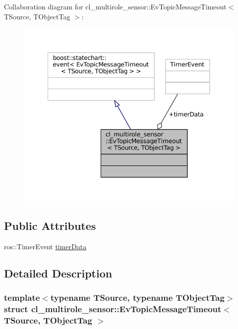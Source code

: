 Collaboration diagram for cl\+\_\+multirole\+\_\+sensor\+:\+:Ev\+Topic\+Message\+Timeout$<$ T\+Source, T\+Object\+Tag $>$\+:
\nopagebreak
\begin{figure}[H]
\begin{center}
\leavevmode
\includegraphics[width=348pt]{structcl__multirole__sensor_1_1EvTopicMessageTimeout__coll__graph}
\end{center}
\end{figure}
\subsection*{Public Attributes}
\begin{DoxyCompactItemize}
\item 
ros\+::\+Timer\+Event \hyperlink{structcl__multirole__sensor_1_1EvTopicMessageTimeout_af4d418aeb793c180ee0becc2dec0dc34}{timer\+Data}
\end{DoxyCompactItemize}


\subsection{Detailed Description}
\subsubsection*{template$<$typename T\+Source, typename T\+Object\+Tag$>$\newline
struct cl\+\_\+multirole\+\_\+sensor\+::\+Ev\+Topic\+Message\+Timeout$<$ T\+Source, T\+Object\+Tag $>$}



